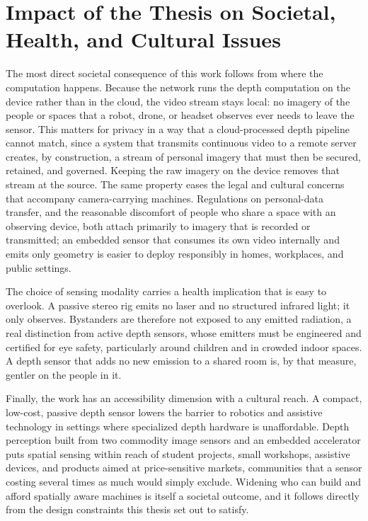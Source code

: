 \section{Impact of the Thesis on Societal, Health, and Cultural Issues}
\label{sec:soc_impact}
The most direct societal consequence of this work follows from where the
computation happens. Because the network runs the depth computation on
the device rather than in the cloud, the video stream stays local: no
imagery of the people or spaces that a robot, drone, or headset observes
ever needs to leave the sensor. This matters for privacy in a way that a
cloud-processed depth pipeline cannot match, since a system that
transmits continuous video to a remote server creates, by construction, a
stream of personal imagery that must then be secured, retained, and
governed. Keeping the raw imagery on the device removes that stream at
the source. The same property eases the legal and cultural concerns that
accompany camera-carrying machines. Regulations on personal-data
transfer, and the reasonable discomfort of people who share a space with
an observing device, both attach primarily to imagery that is recorded
or transmitted; an embedded sensor that consumes its own video internally
and emits only geometry is easier to deploy responsibly in homes,
workplaces, and public settings.

The choice of sensing modality carries a health implication that is easy
to overlook. A passive stereo rig emits no laser and no structured
infrared light; it only observes. Bystanders are therefore not exposed to
any emitted radiation, a real distinction from active depth sensors,
whose emitters must be engineered and certified for eye safety,
particularly around children and in crowded indoor spaces. A depth sensor
that adds no new emission to a shared room is, by that measure, gentler
on the people in it.

Finally, the work has an accessibility dimension with a cultural reach.
A compact, low-cost, passive depth sensor lowers the barrier to robotics
and assistive technology in settings where specialized depth hardware is
unaffordable. Depth perception built from two commodity image sensors and
an embedded accelerator puts spatial sensing within reach of student
projects, small workshops, assistive devices, and products aimed at
price-sensitive markets, communities that a sensor costing several times
as much would simply exclude. Widening who can build and afford spatially
aware machines is itself a societal outcome, and it follows directly from
the design constraints this thesis set out to satisfy.


